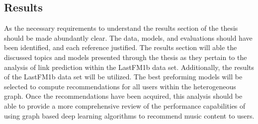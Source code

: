 \subsection{Results}
As the necessary requirements to understand the results section of the thesis should be made abundantly clear. The data, models, and evaluations should have been identified, and each reference justified. The results section will able the discussed topics and models presented through the thesis as they pertain to the analysis of link prediction within the LastFM1b data set. Additionally, the results of the LastFM1b data set will be utilized. The best preforming models will be selected to compute recommendations for all users within the heterogeneous graph. Once the recommendations have been acquired, this analysis should be able to provide a more comprehensive review of the performance capabilities of using graph based deep learning algorithms to recommend music content to users.
